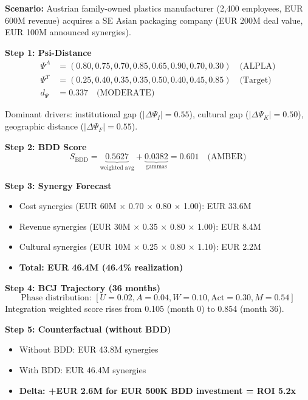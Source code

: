 \begin{tcolorbox}[colback=green!5!white, colframe=green!75!black,
    title=Worked Example: ALPLA SE Asia (CAS-943)]

\textbf{Scenario:} Austrian family-owned plastics manufacturer (2,400 employees,
EUR 600M revenue) acquires a SE Asian packaging company (EUR 200M deal value,
EUR 100M announced synergies).

\textbf{Step 1: Psi-Distance}
\begin{align*}
\Psi^A &= (0.80, 0.75, 0.70, 0.85, 0.65, 0.90, 0.70, 0.30) \quad \text{(ALPLA)} \\
\Psi^T &= (0.25, 0.40, 0.35, 0.35, 0.50, 0.40, 0.45, 0.85) \quad \text{(Target)} \\
d_\Psi &= 0.337 \quad \text{(MODERATE)}
\end{align*}

Dominant drivers: institutional gap ($|\Delta\Psi_I| = 0.55$), cultural gap
($|\Delta\Psi_K| = 0.50$), geographic distance ($|\Delta\Psi_F| = 0.55$).

\textbf{Step 2: BDD Score}
\[
S_{\text{BDD}} = \underbrace{0.5627}_{\text{weighted avg}} + \underbrace{0.0382}_{\text{gammas}} = 0.601 \quad \text{(AMBER)}
\]

\textbf{Step 3: Synergy Forecast}
\begin{itemize}[nosep]
    \item Cost synergies (EUR 60M $\times$ 0.70 $\times$ 0.80 $\times$ 1.00): EUR 33.6M
    \item Revenue synergies (EUR 30M $\times$ 0.35 $\times$ 0.80 $\times$ 1.00): EUR 8.4M
    \item Cultural synergies (EUR 10M $\times$ 0.25 $\times$ 0.80 $\times$ 1.10): EUR 2.2M
    \item \textbf{Total: EUR 46.4M (46.4\% realization)}
\end{itemize}

\textbf{Step 4: BCJ Trajectory (36 months)}
\[
\text{Phase distribution: } [U=0.02, A=0.04, W=0.10, \text{Act}=0.30, M=0.54]
\]
Integration weighted score rises from 0.105 (month 0) to 0.854 (month 36).

\textbf{Step 5: Counterfactual (without BDD)}
\begin{itemize}[nosep]
    \item Without BDD: EUR 43.8M synergies
    \item With BDD: EUR 46.4M synergies
    \item \textbf{Delta: +EUR 2.6M for EUR 500K BDD investment = ROI 5.2x}
\end{itemize}

\end{tcolorbox}


